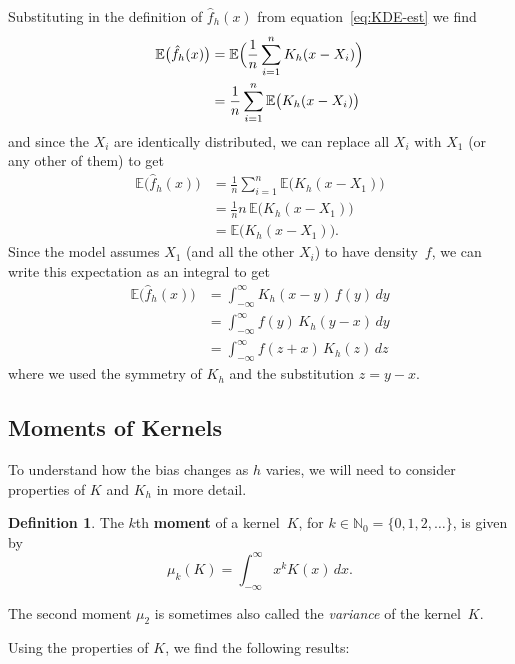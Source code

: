 \documentclass[
  a4paper,
]{article}
\theoremstyle{definition}
\newtheorem{definition}{Definition}[section]
\theoremstyle{definition}
\theoremstyle{definition}
\theoremstyle{definition}
\theoremstyle{remark}
\begin{document}
Substituting in the definition of \(\hat f_h(x)\) from equation~\eqref{eq:KDE-est}
we find
\begin{align*}
    \mathbb{E}\bigl(\hat f_h(x)\bigr)
    &= \mathbb{E}\Bigl( \frac{1}{n} \sum_{i=1}^n K_h(x - X_i) \Bigr) \\
    &= \frac{1}{n} \sum_{i=1}^n \mathbb{E}\bigl( K_h(x - X_i) \bigr)
\end{align*}
and since the \(X_i\) are identically distributed, we can replace
all \(X_i\) with \(X_1\) (or any other of them) to get
\begin{align*}
    \mathbb{E}\bigl(\hat f_h(x)\bigr)
    &= \frac{1}{n} \sum_{i=1}^n \mathbb{E}\bigl( K_h(x - X_1) \bigr) \\
    &= \frac{1}{n} n \, \mathbb{E}\bigl( K_h(x - X_1) \bigr) \\
    &= \mathbb{E}\bigl( K_h(x - X_1) \bigr).
\end{align*}
Since the model assumes \(X_1\) (and all the other \(X_i\)) to have density~\(f\),
we can write this expectation as an integral to get
\begin{align*}
    \mathbb{E}\bigl(\hat f_h(x)\bigr)
    &= \int_{-\infty}^\infty K_h(x - y) \, f(y) \, dy \\
    &= \int_{-\infty}^\infty f(y) \, K_h(y - x) \, dy \\
    &= \int_{-\infty}^\infty f(z+x) \, K_h(z) \, dz
\end{align*}
where we used the symmetry of \(K_h\) and the substitution \(z = y - x\).

\subsection{Moments of Kernels}\label{moments-of-kernels}

To understand how the bias changes as \(h\) varies, we will need to
consider properties of \(K\) and \(K_h\) in more detail.

\begin{definition}
The \(k\)th \textbf{moment} of a kernel~\(K\),
for \(k \in \mathbb{N}_0 = \{0, 1, 2, \ldots\}\), is given by
\begin{equation*}
  \mu_k(K)
  = \int_{-\infty}^\infty x^k K(x) \,dx.
\end{equation*}
\end{definition}

The second moment \(\mu_2\) is sometimes also called the \emph{variance}
of the kernel~\(K\).

Using the properties of \(K\), we find the following results:
\end{document}
